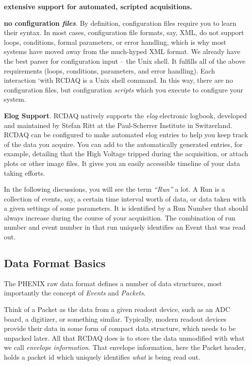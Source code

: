 \documentclass{article}[11pt]
\begin{document}
\begin{description}
\item {\bf extensive support for automated, scripted acquisitions.}

\item {\bf no configuration \emph{files}}. By definition,
  configuration files require you to learn their syntax. In most
  cases, configuration file formats, say, XML, do not support loops,
  conditions, formal parameters, or error handling, which is why most
  systems have moved away from the much-hyped XML format. We already
  have the best parser for configuration input -- the Unix shell. It
  fulfills all of the above requirements (loops, conditions, parameters,
  and error handling). Each interaction `with RCDAQ is a Unix shell
  command. In this way, there are no configuration files, but
  configuration \emph{scripts} which you execute to configure your
  system.

\item {\bf Elog Support}. RCDAQ natively supports the \emph{elog}
  electronic logbook, developed and maintained by Stefan Ritt at the
  Paul-Scherrer Institute in Switzerland. RCDAQ can be configured to
  make automated elog entries to help you keep track of the data you
  acquire.  You can add to the automatically generated entries, for
  example, detailing that the High Voltage tripped during the
  acquisition, or attach plots or other image files. It gives you an
  easily accessible timeline of your data taking efforts. 

\end{description}

In the following discussions, you will see the term \emph{``Run''} a
lot. A Run is a collection of events, say, a certain time interval
worth of data, or data taken with a given settings of some
parameters. It is identified by a Run Number that should always
increase during the course of your acquisition. The combination of run
number and event number in that run uniquely identifies an Event that
was read out.


\subsection{Data Format Basics}

The PHENIX raw data format defines a number of data structures, 
most importantly the concept of \emph{Events} and \emph{Packets}.

Think of a Packet as the data from a given readout device, such as an
ADC board, a digitizer, or something similar. Typically, modern
readout devices provide their data in some form of compact data
structure, which needs to be unpacked later. All that RCDAQ does is to
store the data unmodified with what we call \emph{envelope
  information}. That envelope information, here the Packet header,
holds a packet id which uniquely identifies \emph{what} is being read
out.
\end{document}
